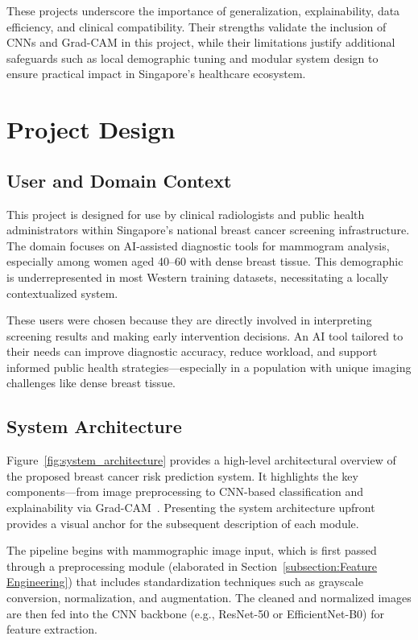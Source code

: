 \documentclass[12pt]{article}
\begin{document}
These projects underscore the importance of generalization, explainability, data efficiency, and clinical compatibility. Their strengths validate the inclusion of CNNs and Grad-CAM in this project, while their limitations justify additional safeguards such as local demographic tuning and modular system design to ensure practical impact in Singapore's healthcare ecosystem.
\newpage
\section{Project Design}

\subsection{User and Domain Context}
This project is designed for use by clinical radiologists and public health administrators within Singapore’s national breast cancer screening infrastructure. The domain focuses on AI-assisted diagnostic tools for mammogram analysis, especially among women aged 40–60 with dense breast tissue. This demographic is underrepresented in most Western training datasets, necessitating a locally contextualized system.

These users were chosen because they are directly involved in interpreting screening results and making early intervention decisions. An AI tool tailored to their needs can improve diagnostic accuracy, reduce workload, and support informed public health strategies—especially in a population with unique imaging challenges like dense breast tissue.

\subsection{System Architecture}

Figure~\ref{fig:system_architecture} provides a high-level architectural overview of the proposed breast cancer risk prediction system. It highlights the key components—from image preprocessing to CNN-based classification and explainability via Grad-CAM~\cite{1,5}. Presenting the system architecture upfront provides a visual anchor for the subsequent description of each module.

The pipeline begins with mammographic image input, which is first passed through a preprocessing module (elaborated in Section~\ref{subsection:Feature Engineering}) that includes standardization techniques such as grayscale conversion, normalization, and augmentation. The cleaned and normalized images are then fed into the CNN backbone (e.g., ResNet-50 or EfficientNet-B0) for feature extraction.
\end{document}
